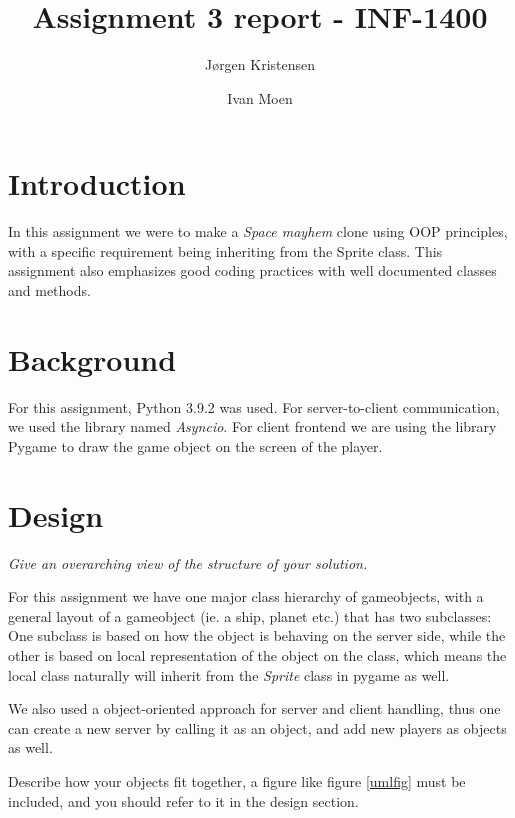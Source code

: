 \documentclass[11pt]{article}
\title{Assignment 3 report - INF-1400}
\author{Jørgen Kristensen \and Ivan Moen}
\begin{document}
    \maketitle


    \section{Introduction}

    In this assignment we were to make a \emph{Space mayhem} clone using OOP principles, with a specific requirement being inheriting from the Sprite class. This assignment also emphasizes good coding practices with well documented classes and methods.


    \section{Background}


    For this assignment, Python 3.9.2 was used. For server-to-client communication, we used the library named \emph{Asyncio}. For client frontend we are using the library Pygame to draw the game object on the screen of the player.


    \section{Design}

    \emph{Give an overarching view of the structure of your solution.}

    For this assignment we have one major class hierarchy of gameobjects, with a
    general layout of a gameobject (ie. a ship, planet etc.) that has two
    subclasses: One subclass is based on how the object is behaving on the server
    side, while the other is based on local representation of the object on the
    class, which means the local class naturally will inherit from the
    \emph{Sprite} class in pygame as well.

    We also used a object-oriented approach for server and client handling, thus
    one can create a new server by calling it as an object, and add new players as
    objects as well.

    Describe how your objects fit together, a figure like figure \ref{umlfig} must be included, and you should refer to it in the design section.

\end{document}
